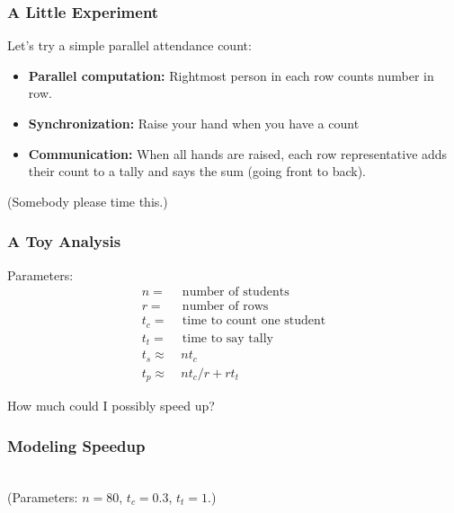 \documentclass{beamer}
\begin{document}
\begin{frame}
  \frametitle{A Little Experiment}
  
  Let's try a simple parallel attendance count:
  \begin{itemize}
  \item {\bf Parallel computation:} Rightmost person in each row 
    counts number in row.
  \item {\bf Synchronization:} Raise your hand when you have a count
  \item {\bf Communication:} When all hands are raised, each row 
        representative adds their count to a tally and says the sum
        (going front to back).
  \end{itemize}

  \vspace{5mm}
  (Somebody please time this.)

\end{frame}


\begin{frame}
  \frametitle{A Toy Analysis}

  Parameters:
  \begin{align*}
    n = & \mbox{ number of students} \\
    r = & \mbox{ number of rows} \\
    t_c = & \mbox{ time to count one student} \\
    t_t = & \mbox{ time to say tally} \\
    t_s \approx & ~n t_c \\
    t_p \approx & ~n t_c / r + r t_t
  \end{align*}

  \vspace{5mm}
  How much could I possibly speed up?

\end{frame}


\begin{frame}
\frametitle{Modeling Speedup}

\begin{center}
   \\[1cm]
(Parameters: $n = 80$, $t_c = 0.3$, $t_t = 1$.)
\end{center}
\end{frame}
\end{document}
